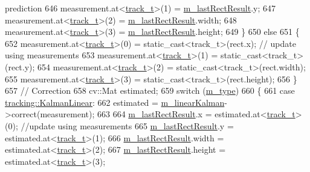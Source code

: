\begin{DoxyCode}
{       prediction}
646             measurement.at<\mbox{\hyperlink{defines_8h_a7ce9c8817b42ab418e61756f579549ab}{track\_t}}>(1) = \mbox{\hyperlink{class_t_kalman_filter_aed4818c7aac455928ef02dd03f8bfe56}{m\_lastRectResult}}.y;
647             measurement.at<\mbox{\hyperlink{defines_8h_a7ce9c8817b42ab418e61756f579549ab}{track\_t}}>(2) = \mbox{\hyperlink{class_t_kalman_filter_aed4818c7aac455928ef02dd03f8bfe56}{m\_lastRectResult}}.width;
648             measurement.at<\mbox{\hyperlink{defines_8h_a7ce9c8817b42ab418e61756f579549ab}{track\_t}}>(3) = \mbox{\hyperlink{class_t_kalman_filter_aed4818c7aac455928ef02dd03f8bfe56}{m\_lastRectResult}}.height;
649         \}
650         \textcolor{keywordflow}{else}
651         \{
652             measurement.at<\mbox{\hyperlink{defines_8h_a7ce9c8817b42ab418e61756f579549ab}{track\_t}}>(0) = static\_cast<track\_t>(rect.x);  \textcolor{comment}{// update using measurements}
653             measurement.at<\mbox{\hyperlink{defines_8h_a7ce9c8817b42ab418e61756f579549ab}{track\_t}}>(1) = static\_cast<track\_t>(rect.y);
654             measurement.at<\mbox{\hyperlink{defines_8h_a7ce9c8817b42ab418e61756f579549ab}{track\_t}}>(2) = static\_cast<track\_t>(rect.width);
655             measurement.at<\mbox{\hyperlink{defines_8h_a7ce9c8817b42ab418e61756f579549ab}{track\_t}}>(3) = static\_cast<track\_t>(rect.height);
656         \}
657         \textcolor{comment}{// Correction}
658         cv::Mat estimated;
659         \textcolor{keywordflow}{switch} (\mbox{\hyperlink{class_t_kalman_filter_a00cabc6683f6cc848559515df46d7101}{m\_type}})
660         \{
661         \textcolor{keywordflow}{case} \mbox{\hyperlink{namespacetracking_a83f2c4d58ea2737f7d6296dce3eb722aa889eca583e371386c92e05814797a885}{tracking::KalmanLinear}}:
662             estimated = \mbox{\hyperlink{class_t_kalman_filter_aec607aacb57ef1f78e514c6b3ef18435}{m\_linearKalman}}->correct(measurement);
663 
664             \mbox{\hyperlink{class_t_kalman_filter_aed4818c7aac455928ef02dd03f8bfe56}{m\_lastRectResult}}.x = estimated.at<\mbox{\hyperlink{defines_8h_a7ce9c8817b42ab418e61756f579549ab}{track\_t}}>(0);   \textcolor{comment}{//update using
       measurements}
665             \mbox{\hyperlink{class_t_kalman_filter_aed4818c7aac455928ef02dd03f8bfe56}{m\_lastRectResult}}.y = estimated.at<\mbox{\hyperlink{defines_8h_a7ce9c8817b42ab418e61756f579549ab}{track\_t}}>(1);
666             \mbox{\hyperlink{class_t_kalman_filter_aed4818c7aac455928ef02dd03f8bfe56}{m\_lastRectResult}}.width = estimated.at<\mbox{\hyperlink{defines_8h_a7ce9c8817b42ab418e61756f579549ab}{track\_t}}>(2);
667             \mbox{\hyperlink{class_t_kalman_filter_aed4818c7aac455928ef02dd03f8bfe56}{m\_lastRectResult}}.height = estimated.at<\mbox{\hyperlink{defines_8h_a7ce9c8817b42ab418e61756f579549ab}{track\_t}}>(3);

\end{DoxyCode}
